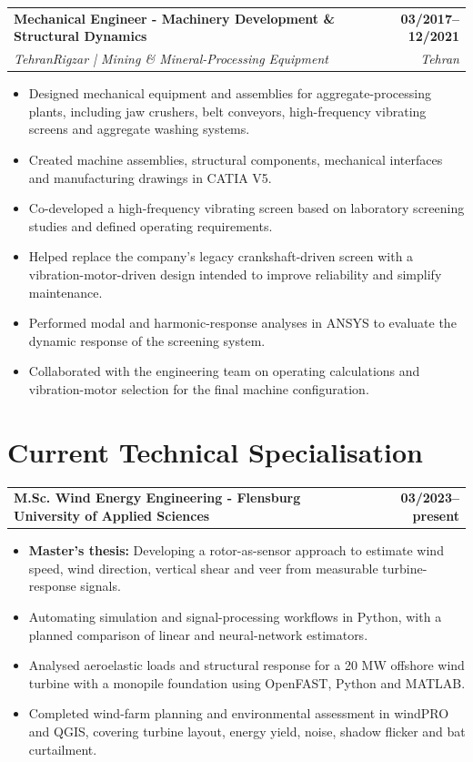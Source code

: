 \documentclass[10pt,a4paper]{article}
\makeatletter
\newcommand{\cvjob}[4]{%
  \begin{tabularx}{\linewidth}{@{}Xr@{}}
    \textbf{#1} & \textbf{#2}\\[-1pt]
    \textit{#3} & \textit{#4}
  \end{tabularx}
  \vspace{0.05em}
}
\newcommand{\cvproject}[2]{%
  \begin{tabularx}{\linewidth}{@{}Xr@{}}
    \textbf{#1} & \textbf{#2}
  \end{tabularx}
  \vspace{0.05em}
}
\makeatother
\begin{document}
\cvjob{Mechanical Engineer - Machinery Development \& Structural Dynamics}{03/2017--12/2021}{TehranRigzar | Mining \& Mineral-Processing Equipment}{Tehran}
\begin{itemize}
  \item Designed mechanical equipment and assemblies for aggregate-processing plants, including jaw crushers, belt conveyors, high-frequency vibrating screens and aggregate washing systems.

  \item Created machine assemblies, structural components, mechanical interfaces and manufacturing drawings in CATIA V5.

  \item Co-developed a high-frequency vibrating screen based on laboratory screening studies and defined operating requirements.

  \item Helped replace the company's legacy crankshaft-driven screen with a vibration-motor-driven design intended to improve reliability and simplify maintenance.

  \item Performed modal and harmonic-response analyses in ANSYS to evaluate the dynamic response of the screening system.

  \item Collaborated with the engineering team on operating calculations and vibration-motor selection for the final machine configuration.

\end{itemize}

\newpage

\section{Current Technical Specialisation}
\cvproject{M.Sc. Wind Energy Engineering - Flensburg University of Applied Sciences}{03/2023--present}
\begin{itemize}
  \item \textbf{Master's thesis:} Developing a rotor-as-sensor approach to estimate wind speed, wind direction, vertical shear and veer from measurable turbine-response signals.

  \item Automating simulation and signal-processing workflows in Python, with a planned comparison of linear and neural-network estimators.

  \item Analysed aeroelastic loads and structural response for a 20 MW offshore wind turbine with a monopile foundation using OpenFAST, Python and MATLAB.

  \item Completed wind-farm planning and environmental assessment in windPRO and QGIS, covering turbine layout, energy yield, noise, shadow flicker and bat curtailment.
\end{itemize}
\end{document}
